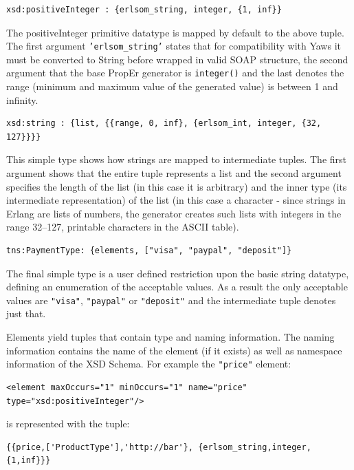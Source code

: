 \documentclass[submission,copyright,a4]{eptcs}
\begin{document}
\begin{lstlisting}
xsd:positiveInteger : {erlsom_string, integer, {1, inf}}
\end{lstlisting}

The positiveInteger primitive datatype is mapped by default to the above tuple. 
The first argument \texttt{'erlsom\_string'} states that for compatibility with 
Yaws it must be converted to String before wrapped in valid SOAP structure, 
the second argument that the base PropEr generator is \texttt{integer()} and the 
last denotes the range (minimum and maximum value of the generated value) is 
between 1 and infinity. 

\begin{lstlisting}
xsd:string : {list, {{range, 0, inf}, {erlsom_int, integer, {32, 127}}}}
\end{lstlisting}

This simple type shows how strings are mapped to intermediate tuples. The first 
argument shows that the entire tuple represents a list and the second argument 
specifies the length of the list (in this case it is arbitrary) and the inner type 
(its intermediate representation) of the list (in this case a character - since 
strings in Erlang are lists of numbers, the generator creates such lists with 
integers in the range 32--127, printable characters in the ASCII table).

\begin{lstlisting}
tns:PaymentType: {elements, ["visa", "paypal", "deposit"]}
\end{lstlisting}

The final simple type is a user defined restriction upon the basic
string datatype, defining an enumeration of the acceptable values. As
a result the only acceptable values are \texttt{"visa"},
\texttt{"paypal"} or \texttt{"deposit"} and the intermediate tuple
denotes just that.

Elements yield tuples that contain type and naming information. The
naming information contains the name of the element (if it exists) as
well as namespace information of the XSD Schema. For example the
\texttt{"price"} element:
\begin{lstlisting}
<element maxOccurs="1" minOccurs="1" name="price" type="xsd:positiveInteger"/>
\end{lstlisting}
is represented with the tuple:
\begin{lstlisting}
{{price,['ProductType'],'http://bar'}, {erlsom_string,integer,{1,inf}}}
\end{lstlisting}
\end{document}
